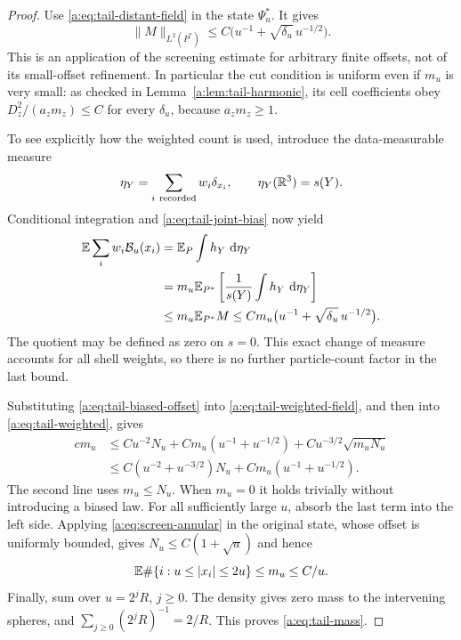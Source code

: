 \begin{proof}
Use \eqref{a:eq:tail-distant-field} in the state $\Psi_u^*$.  It gives
\begin{equation}\label{a:eq:tail-biased-field}
 \|M\|_{L^2(P^*)}
 \le C\big(u^{-1}+\sqrt{\delta_u}\,u^{-1/2}\big).
\end{equation}
This is an application of the screening estimate for arbitrary finite
offsets, not of its small-offset refinement.  In particular the cut
condition is uniform even if $m_u$ is very small: as checked in
Lemma~\ref{a:lem:tail-harmonic}, its cell coefficients obey
$D_z^2/(a_zm_z)\le C$ for every $\delta_u$, because $a_zm_z\ge1$.

To see explicitly how the weighted count is used, introduce the
data-measurable measure
\[
 \eta_Y=\sum_{i\ {\rm recorded}}w_i\delta_{x_i},
 \qquad \eta_Y(\R^3)=s(Y).
\]
Conditional integration and \eqref{a:eq:tail-joint-bias} now yield
\begin{align}
 \mathbb E\sum_iw_i\mathcal B_u(x_i)
 &=\mathbb E_P\int h_Y\,\,\mathrm d\eta_Y\notag\\
 &=m_u\mathbb E_{P^*}
      \left[\frac1{s(Y)}\int h_Y\,\,\mathrm d\eta_Y\right]\notag\\
 &\le m_u\mathbb E_{P^*}M
 \le C m_u\big(u^{-1}+\sqrt{\delta_u}\,u^{-1/2}\big).
 \label{a:eq:tail-weighted-field}
\end{align}
The quotient may be defined as zero on $s=0$.  This exact change of
measure accounts for all shell weights, so there is no further
particle-count factor in the last bound.

Substituting \eqref{a:eq:tail-biased-offset} into
\eqref{a:eq:tail-weighted-field}, and then into
\eqref{a:eq:tail-weighted}, gives
\begin{align*}
 c m_u
 &\le Cu^{-2}N_u
    +Cm_u(u^{-1}+u^{-1/2})
    +Cu^{-3/2}\sqrt{m_uN_u}\\
 &\le C(u^{-2}+u^{-3/2})N_u
    +Cm_u(u^{-1}+u^{-1/2}).
\end{align*}
The second line uses $m_u\le N_u$.  When $m_u=0$ it holds trivially
without introducing a biased law.  For all sufficiently large $u$,
absorb the last term into the left side.  Applying
\eqref{a:eq:screen-annular} in the original state, whose offset is
uniformly bounded, gives $N_u\le C(1+\sqrt u)$ and hence
\begin{equation}\label{a:eq:tail-shell-mass}
 \mathbb E\#\{i:u\le|x_i|\le2u\}\le m_u\le C/u.
\end{equation}
Finally, sum over $u=2^jR$, $j\ge0$.  The density gives zero mass to
the intervening spheres, and $\sum_{j\ge0}(2^jR)^{-1}=2/R$.
This proves \eqref{a:eq:tail-mass}.
\end{proof}


